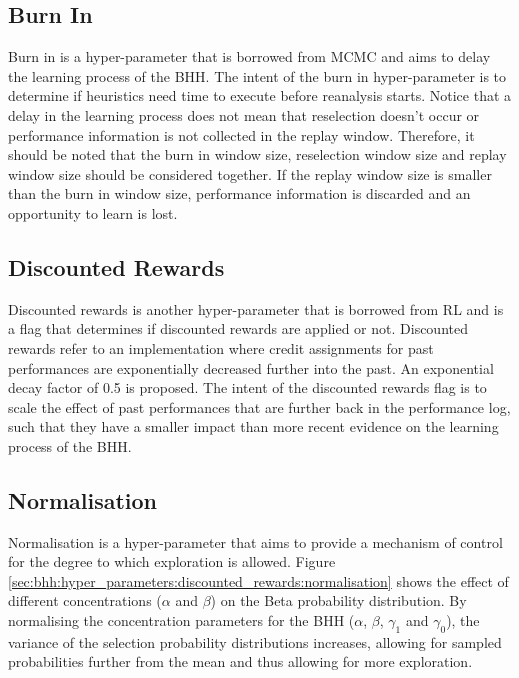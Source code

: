 \subsection{Burn In}\label{sec:bhh:hyper_parameters:burn_in}

Burn in is a hyper-parameter that is borrowed from \acf{MCMC} and aims to delay the learning process of the \acs{BHH}. The intent of the burn in hyper-parameter is to determine if heuristics need time to execute before reanalysis starts. Notice that a delay in the learning process does not mean that reselection doesn't occur or performance information is not collected in the replay window. Therefore, it should be noted that the burn in window size, reselection window size and replay window size should be considered together. If the replay window size is smaller than the burn in window size, performance information is discarded and an opportunity to learn is lost.

\subsection{Discounted Rewards}\label{sec:bhh:hyper_parameters:discounted_rewards}

Discounted rewards is another hyper-parameter that is borrowed from \acs{RL} and is a flag that determines if discounted rewards are applied or not. Discounted rewards refer to an implementation where credit assignments for past performances are exponentially decreased further into the past. An exponential decay factor of 0.5 is proposed. The intent of the discounted rewards flag is to scale the effect of past performances that are further back in the performance log, such that they have a smaller impact than more recent evidence on the learning process of the \acs{BHH}.

\subsection{Normalisation}\label{sec:bhh:hyper_parameters:normalisation}

Normalisation is a hyper-parameter that aims to provide a mechanism of control for the degree to which exploration is allowed. Figure \ref{sec:bhh:hyper_parameters:discounted_rewards:normalisation} shows the effect of different concentrations ($\alpha$ and $\beta$) on the Beta probability distribution. By normalising the concentration parameters for the \acs{BHH} ($\alpha$, $\beta$, $\gamma_{1}$ and $\gamma_{0}$), the variance of the selection probability distributions increases, allowing for sampled probabilities further from the mean and thus allowing for more exploration.

